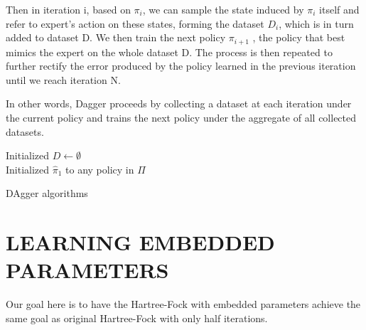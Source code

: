 \documentclass[twoside]{article}
\begin{document}
Then in iteration i, based on $\pi_i$, we can sample the state induced by $\pi_i$ itself and refer to expert's action on these states, forming the dataset $D_i$, which is in turn added to dataset D. We then train the next policy $\pi_{i+1}$ , the policy that best mimics the expert on the whole dataset D. The process is then repeated to further rectify the error produced by the policy learned in the previous iteration until we reach iteration N.

In other words, Dagger proceeds by collecting a dataset
at each iteration under the current policy and trains the next policy under the aggregate of all collected datasets. 






\begin{algorithm}[htb]
 \KwData{}
 Initialized $D \leftarrow \emptyset$ \\
 Initialized $\hat{\pi}_1$ to any policy in $\Pi$ \\
 \caption{DAgger algorithms}
\end{algorithm}



\section{LEARNING EMBEDDED PARAMETERS}

Our goal here is to have the Hartree-Fock with embedded parameters achieve the same goal as original Hartree-Fock with only half iterations.
\end{document}
